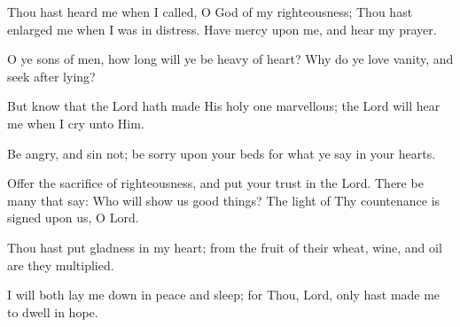 Thou hast heard me when I called, O God of my righteousness; Thou hast enlarged me when I was in distress. Have mercy upon me, and hear my prayer.

O ye sons of men, how long will ye be heavy of heart? Why do ye love vanity, and seek after lying?

But know that the Lord hath made His holy one marvellous; the Lord will hear me when I cry unto Him.

Be angry, and sin not; be sorry upon your beds for what ye say in your hearts.

Offer the sacrifice of righteousness, and put your trust in the Lord. There be many that say: Who will show us good things? The light of Thy countenance is signed upon us, O Lord.

Thou hast put gladness in my heart; from the fruit of their wheat, wine, and oil are they multiplied.

I will both lay me down in peace and sleep; for Thou, Lord, only hast made me to dwell in hope.

